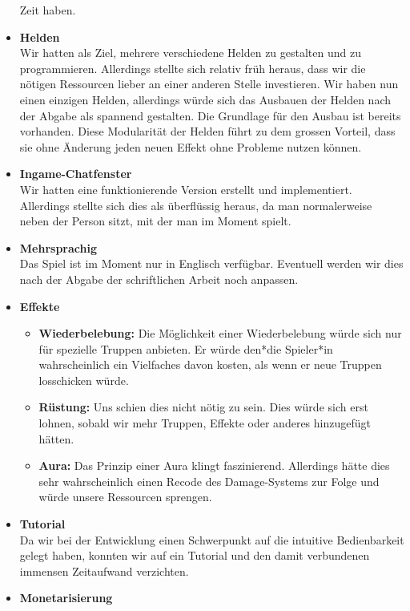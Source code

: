 \begin{itemize}
        Zeit haben.
    \item \textbf{Helden} \\
        Wir hatten als Ziel, mehrere verschiedene Helden zu gestalten und zu programmieren. Allerdings stellte sich relativ früh heraus, dass wir die nötigen Ressourcen
        lieber an einer anderen Stelle investieren. Wir haben nun einen einzigen Helden, allerdings würde sich das Ausbauen der Helden nach der Abgabe als spannend gestalten.
        Die Grundlage für den Ausbau ist bereits vorhanden. Diese Modularität der Helden führt zu dem grossen Vorteil, dass sie ohne Änderung jeden neuen Effekt ohne Probleme nutzen können.
    \item \textbf{Ingame-Chatfenster}\\
        Wir hatten eine funktionierende Version erstellt und implementiert. Allerdings stellte sich dies als überflüssig heraus, da man normalerweise neben der Person sitzt,
        mit der man im Moment spielt.
    \item \textbf{Mehrsprachig} \\
        Das Spiel ist im Moment nur in Englisch verfügbar. Eventuell werden wir dies nach der Abgabe der schriftlichen Arbeit noch anpassen.
    \item \textbf{Effekte}
    \begin{itemize}
        \item \textbf{Wiederbelebung:}
            Die Möglichkeit einer Wiederbelebung würde sich nur für spezielle Truppen anbieten. Er würde den*die Spieler*in wahrscheinlich ein Vielfaches davon kosten,
            als wenn er neue Truppen losschicken würde. 
        \item \textbf{Rüstung:}
            Uns schien dies nicht nötig zu sein. Dies würde sich erst lohnen, sobald wir mehr Truppen, Effekte oder anderes hinzugefügt hätten.
        \item \textbf{Aura:}
            Das Prinzip einer Aura klingt faszinierend. Allerdings hätte dies sehr wahrscheinlich einen Recode des Damage-Systems zur Folge und würde unsere Ressourcen sprengen.
    \end{itemize}
    \item \textbf{Tutorial} \\
        Da wir bei der Entwicklung einen Schwerpunkt auf die intuitive Bedienbarkeit gelegt haben, konnten wir auf ein Tutorial und den damit verbundenen immensen Zeitaufwand verzichten.
    \item \textbf{Monetarisierung} \\

\end{itemize}
